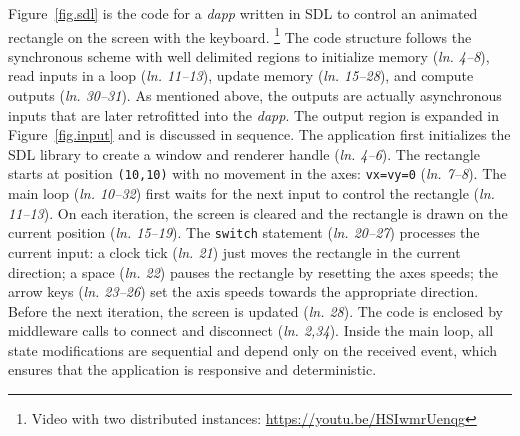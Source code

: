\documentclass[sigplan,screen]{acmart}
\newcommand{\lin}[1]{(\emph{ln. #1}\xspace)}
\newcommand{\dapp}{\emph{dapp}\xspace}
\begin{document}
Figure~\ref{fig.sdl} is the code for a \dapp written in SDL to control an
animated rectangle on the screen with the keyboard.%
\footnote {
    Video with two distributed instances: \url{https://youtu.be/HSIwmrUenqg}
}
The code structure follows the synchronous scheme with well delimited regions
to initialize memory \lin{4--8}, read inputs in a loop \lin{11--13}, update
memory \lin{15--28}, and compute outputs \lin{30--31}.
As mentioned above, the outputs are actually asynchronous inputs that are later
retrofitted into the \dapp.
The output region is expanded in Figure~\ref{fig.input} and is discussed in
sequence.
The application first initializes the SDL library to create a window and
renderer handle \lin{4--6}.
The rectangle starts at position \texttt{(10,10)} with no movement in the axes:
\texttt{vx=vy=0} \lin{7--8}.
The main loop \lin{10--32} first waits for the next input to control the
rectangle \lin{11--13}.
On each iteration, the screen is cleared and the rectangle is drawn on the
current position \lin{15--19}.
The \texttt{switch} statement \lin{20--27} processes the current input:
    a clock tick \lin{21} just moves the rectangle in the current direction;
    a space \lin{22} pauses the rectangle by resetting the axes speeds;
    the arrow keys \lin{23--26} set the axis speeds towards the appropriate direction.
Before the next iteration, the screen is updated \lin{28}.
The code is enclosed by middleware calls to connect and disconnect \lin{2,34}.
Inside the main loop, all state modifications are sequential and depend only on
the received event, which ensures that the application is responsive and
deterministic.
\end{document}
